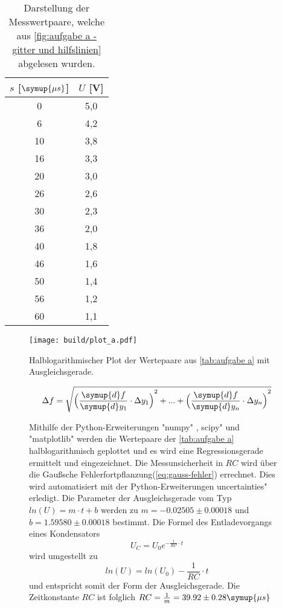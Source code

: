 \begin{table}
  \centering
  \caption{Darstellung der Messwertpaare, welche aus \autoref{fig:aufgabe a - gitter und hilfslinien} abgelesen wurden.}
  \label{tab:aufgabe a}
  \begin{tabular}{S[table-format=2.0] S[table-format=1.1]}
    \toprule
    {$s$ [$\symup{\mu s}$]} & {$U$ [V]} \\
     &  5,0 \\
    6	&  4,2 \\
    10 & 3,8 \\
    16 & 3,3 \\
    20 & 3,0 \\
    26 & 2,6 \\
    30 & 2,3 \\
    36 & 2,0 \\
    40 & 1,8 \\
    46 & 1,6 \\
    50 & 1,4 \\
    56 & 1,2 \\
    60 & 1,1 \\
    \bottomrule
  \end{tabular}
\end{table}

\begin{figure}
  \centering
  \texttt{[image: build/plot\_a.pdf]}
  \caption{Halblogarithmischer Plot der Wertepaare aus \autoref{tab:aufgabe a} %
  mit Ausgleichsgerade.}
  \label{fig:plot_a}
\end{figure}

\begin{equation}
  \Delta f = \sqrt{{\Bigl(\frac{\symup{d}f}{\symup{d}y_{1}} \cdot \Delta y_{1}\Bigr)}^{2} + ...%
   + {\Bigl(\frac{\symup{d}f}{\symup{d}y_{n}} \cdot \Delta y_{n}\Bigr)}^{2} }
  \label{eq:gauss-fehler}
\end{equation}

\begin{figure}[!h]
  Mithilfe der Python-Erweiterungen "numpy" \cite{numpy}, \dq scipy" \cite{scipy} und "matplotlib" \cite{matplotlib} werden die Wertepaare der 
\autoref{tab:aufgabe a} halblogarithmisch geplottet und es wird eine Regressionsgerade ermittelt und eingezeichnet. Die Messunsicherheit in $RC$
wird über die Gaußsche Fehlerfortpflanzung(\autoref{eq:gauss-fehler}) errechnet. Dies wird automatisiert mit der Python-Erweiterungen
\dq uncertainties"\cite{uncertainties} erledigt. Die Parameter der
Ausgleichsgerade vom Typ $ln(U) = m \cdot t + b$ werden zu $m=-0.02505\pm0.00018$ und $b=1.59580\pm0.00018$ bestimmt.
  Die Formel des Entladevorgangs eines Kondensators
  \begin{equation}
    U_{C} = U_{0}e^{-\frac{1}{RC}\cdot t}
  \end{equation}
  wird umgestellt zu
  \begin{equation}
    ln(U) = ln(U_{0})-\frac{1}{RC}\cdot t
  \end{equation}
  und entspricht somit der Form der Ausgleichsgerade. Die Zeitkonstante $RC$ ist folglich 
  $RC = \frac{1}{m} = 39.92\pm0.28 \symup{\mu s}$
\end{figure}

